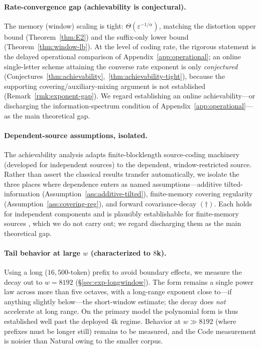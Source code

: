 \documentclass[11pt]{article}
\theoremstyle{plain}
\theoremstyle{definition}
\theoremstyle{remark}
\begin{document}
\paragraph{Rate-convergence gap (achievability is conjectural).}
The memory (window) scaling is tight: $\Theta(\varepsilon^{-1/\alpha})$,
matching the distortion upper bound (Theorem~\ref{thm:E2}) and the
suffix-only lower bound (Theorem~\ref{thm:window-lb}). At the level of
coding rate, the rigorous statement is the delayed operational
comparison of Appendix~\ref{app:operational}; an online single-letter
scheme attaining the converse rate exponent is only \emph{conjectured}
(Conjectures~\ref{thm:achievability},~\ref{thm:achievability-tight}),
because the supporting covering/auxiliary-mixing argument is not
established (Remark~\ref{rmk:exponent-gap}). We regard establishing an
online achievability---or discharging the information-spectrum
condition of Appendix~\ref{app:operational}---as the main theoretical
gap.

\paragraph{Dependent-source assumptions, isolated.}
The achievability analysis adapts finite-blocklength source-coding
machinery (developed for independent sources) to the dependent,
window-restricted source. Rather than assert the classical results
transfer automatically, we isolate the three places where dependence
enters as named assumptions---additive tilted-information
(Assumption~\ref{ass:additive-tilted}), finite-memory covering
regularity (Assumption~\ref{ass:covering-reg}), and forward
covariance-decay $(\dagger)$. Each holds for independent components
and is plausibly establishable for finite-memory sources
\citep{douc2018markov,tasci2024dispersion}, which we do not carry
out; we regard discharging them as the main theoretical gap.

\paragraph{Tail behavior at large $w$ (characterized to $8$k).}
Using a long ($16{,}500$-token) prefix to avoid boundary effects, we
measure the decay out to $w = 8192$ (\S\ref{sec:exp-longwindow}). The
form remains a single power law across more than five octaves, with a
long-range exponent close to---if anything slightly below---the
short-window estimate; the decay does \emph{not} accelerate at long
range. On the primary model the polynomial form is thus established
well past the deployed
$4$k regime. Behavior at $w \gg 8192$ (where prefixes must be longer
still) remains to be measured, and the Code measurement is noisier
than Natural owing to the smaller corpus.
\end{document}
